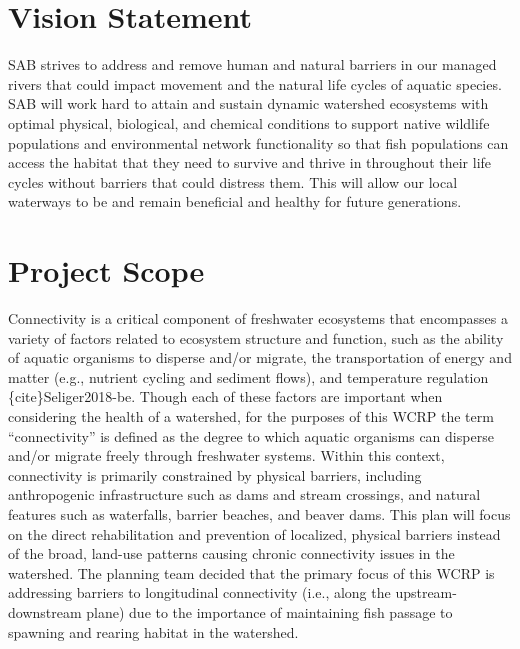 \documentclass[
  letterpaper,
  DIV=11,
  numbers=noendperiod]{scrreprt}
\begin{document}
\section*{Vision Statement}\label{vision-statement}


SAB strives to address and remove human and natural barriers in our
managed rivers that could impact movement and the natural life cycles of
aquatic species. SAB will work hard to attain and sustain dynamic
watershed ecosystems with optimal physical, biological, and chemical
conditions to support native wildlife populations and environmental
network functionality so that fish populations can access the habitat
that they need to survive and thrive in throughout their life cycles
without barriers that could distress them. This will allow our local
waterways to be and remain beneficial and healthy for future
generations.

\section*{Project Scope}\label{project-scope}


Connectivity is a critical component of freshwater ecosystems that
encompasses a variety of factors related to ecosystem structure and
function, such as the ability of aquatic organisms to disperse and/or
migrate, the transportation of energy and matter (e.g., nutrient cycling
and sediment flows), and temperature regulation \{cite\}Seliger2018-be.
Though each of these factors are important when considering the health
of a watershed, for the purposes of this WCRP the term ``connectivity''
is defined as the degree to which aquatic organisms can disperse and/or
migrate freely through freshwater systems. Within this context,
connectivity is primarily constrained by physical barriers, including
anthropogenic infrastructure such as dams and stream crossings, and
natural features such as waterfalls, barrier beaches, and beaver dams.
This plan will focus on the direct rehabilitation and prevention of
localized, physical barriers instead of the broad, land-use patterns
causing chronic connectivity issues in the watershed. The planning team
decided that the primary focus of this WCRP is addressing barriers to
longitudinal connectivity (i.e., along the upstream-downstream plane)
due to the importance of maintaining fish passage to spawning and
rearing habitat in the watershed.
\end{document}
